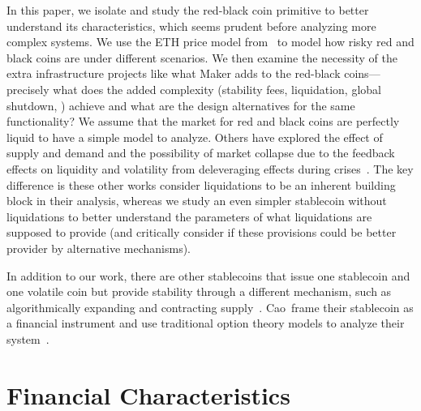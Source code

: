 In this paper, we isolate and study the red-black coin primitive to better understand its characteristics, which seems prudent before analyzing more complex systems. We use the ETH price model from~\cite{GPH+20} to model how risky red and black coins are under different scenarios. We then examine the necessity of the extra infrastructure projects like what Maker adds to the red-black coins---precisely what does the added complexity (\eg stability fees, liquidation, global shutdown, \etc) achieve and what are the design alternatives for the same functionality? We assume that the market for red and black coins are perfectly liquid to have a simple model to analyze. Others have explored the effect of supply and demand and the possibility of market collapse due to the feedback effects on liquidity and volatility from deleveraging effects during crises~\cite{klages2019stability,KMM20}. The key difference is these other works consider liquidations to be an inherent building block in their analysis, whereas we study an even simpler stablecoin without liquidations to better understand the parameters of what liquidations are supposed to provide (and critically consider if these provisions could be better provider by alternative mechanisms).  

In addition to our work, there are other stablecoins that issue one stablecoin and one volatile coin but provide stability through a different mechanism, such as algorithmically expanding and contracting supply~\cite{Sam15}. Cao~\etal frame their stablecoin as a financial instrument and use traditional option theory models to analyze their system~\cite{DUOnet}.



\section{Financial Characteristics}


